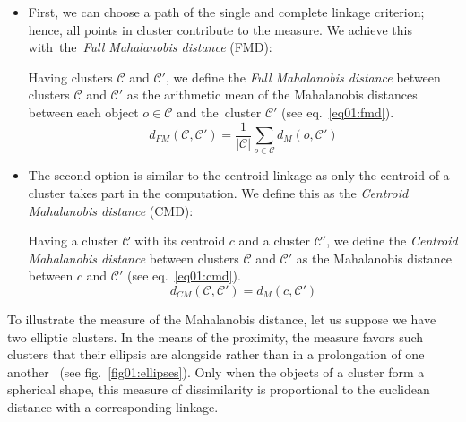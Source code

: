 \begin{itemize}

\item
First, we can choose a path of the single and complete linkage criterion; hence, all points in cluster contribute to the measure. We achieve this with~the~\emph{Full Mahalanobis distance} (FMD):

\begin{defn}
	Having clusters $\mathcal{C}$ and $\mathcal{C}'$, we define the \emph{Full Mahalanobis distance} between clusters $\mathcal{C}$ and $\mathcal{C}'$ as the arithmetic mean of the Mahalanobis distances between each object $o \in \mathcal{C}$ and the~cluster $\mathcal{C}'$ (see eq.~\ref{eq01:fmd}).
	\begin{equation}\label{eq01:fmd}
	d_{FM}(\mathcal{C},\mathcal{C}') =\frac{1}{|\mathcal{C}|}\sum_{o\in\mathcal{C}}{d_M(o,\mathcal{C}')}
	\end{equation}
	\label{def01:fmd}
\end{defn}

\item
The second option is similar to the centroid linkage as only the centroid of a cluster takes part in the computation. We define this as the \emph{Centroid Mahalanobis distance} (CMD):

\begin{defn}
	Having a cluster $\mathcal{C}$ with its centroid $c$ and a cluster $\mathcal{C}'$, we define the \emph{Centroid Mahalanobis distance} between clusters $\mathcal{C}$ and $\mathcal{C}'$ as the Mahalanobis distance between $c$ and $\mathcal{C}'$ (see eq.~\ref{eq01:cmd}).
	\begin{equation}\label{eq01:cmd}
	d_{CM}(\mathcal{C},\mathcal{C}')=d_M(c,\mathcal{C}')
	\end{equation}
	\label{def01:cmd}
\end{defn}

\end{itemize}

To illustrate the measure of the Mahalanobis distance, let us suppose we have two elliptic clusters. In the means of the proximity, the measure favors such clusters that their ellipsis are alongside rather than in a prolongation of one another~\cite{dagnelie1991using} (see fig.~\ref{fig01:ellipses}). Only when the objects of a cluster form a spherical shape, this measure of dissimilarity is proportional to the euclidean distance with a corresponding linkage.

